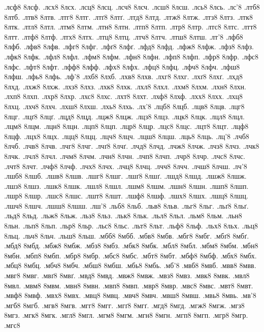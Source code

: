 {.лсф8
8лсф.
.лсх8
8лсх.
.лсц8
8лсц.
.лсч8
8лсч.
.лсш8
8лсш.
.лсь8
8лсь.
.лс'8
.лтб8
8лтб.
.лтв8
8лтв.
.лтг8
8лтг.
.лтґ8
8лтґ.
.лтд8
8лтд.
.лтж8
8лтж.
.лтз8
8лтз.
.лтк8
8лтк.
.лтл8
8лтл.
.лтм8
8лтм.
.лтн8
8лтн.
.лтп8
8лтп.
.лтр8
8лтр.
.лтс8
8лтс.
.лтт8
8лтт.
.лтф8
8лтф.
.лтх8
8лтх.
.лтц8
8лтц.
.лтч8
8лтч.
.лтш8
8лтш.
.лт'8
.лфб8
8лфб.
.лфв8
8лфв.
.лфг8
8лфг.
.лфґ8
8лфґ.
.лфд8
8лфд.
.лфж8
8лфж.
.лфз8
8лфз.
.лфк8
8лфк.
.лфл8
8лфл.
.лфм8
8лфм.
.лфн8
8лфн.
.лфп8
8лфп.
.лфр8
8лфр.
.лфс8
8лфс.
.лфт8
8лфт.
.лфф8
8лфф.
.лфх8
8лфх.
.лфц8
8лфц.
.лфч8
8лфч.
.лфш8
8лфш.
.лфь8
8лфь.
.лф'8
.лхб8
8лхб.
.лхв8
8лхв.
.лхг8
8лхг.
.лхґ8
8лхґ.
.лхд8
8лхд.
.лхж8
8лхж.
.лхз8
8лхз.
.лхк8
8лхк.
.лхл8
8лхл.
.лхм8
8лхм.
.лхн8
8лхн.
.лхп8
8лхп.
.лхр8
8лхр.
.лхс8
8лхс.
.лхт8
8лхт.
.лхф8
8лхф.
.лхх8
8лхх.
.лхц8
8лхц.
.лхч8
8лхч.
.лхш8
8лхш.
.лхь8
8лхь.
.лх'8
.лцб8
8лцб.
.лцв8
8лцв.
.лцг8
8лцг.
.лцґ8
8лцґ.
.лцд8
8лцд.
.лцж8
8лцж.
.лцз8
8лцз.
.лцк8
8лцк.
.лцл8
8лцл.
.лцм8
8лцм.
.лцн8
8лцн.
.лцп8
8лцп.
.лцр8
8лцр.
.лцс8
8лцс.
.лцт8
8лцт.
.лцф8
8лцф.
.лцх8
8лцх.
.лцц8
8лцц.
.лцч8
8лцч.
.лцш8
8лцш.
.лць8
8лць.
.лц'8
.лчб8
8лчб.
.лчв8
8лчв.
.лчг8
8лчг.
.лчґ8
8лчґ.
.лчд8
8лчд.
.лчж8
8лчж.
.лчз8
8лчз.
.лчк8
8лчк.
.лчл8
8лчл.
.лчм8
8лчм.
.лчн8
8лчн.
.лчп8
8лчп.
.лчр8
8лчр.
.лчс8
8лчс.
.лчт8
8лчт.
.лчф8
8лчф.
.лчх8
8лчх.
.лчц8
8лчц.
.лчч8
8лчч.
.лчш8
8лчш.
.лч'8
.лшб8
8лшб.
.лшв8
8лшв.
.лшг8
8лшг.
.лшґ8
8лшґ.
.лшд8
8лшд.
.лшж8
8лшж.
.лшз8
8лшз.
.лшк8
8лшк.
.лшл8
8лшл.
.лшм8
8лшм.
.лшн8
8лшн.
.лшп8
8лшп.
.лшр8
8лшр.
.лшс8
8лшс.
.лшт8
8лшт.
.лшф8
8лшф.
.лшх8
8лшх.
.лшц8
8лшц.
.лшч8
8лшч.
.лшш8
8лшш.
.лш'8
.льб8
8льб.
.льв8
8льв.
.льг8
8льг.
.льґ8
8льґ.
.льд8
8льд.
.льж8
8льж.
.льз8
8льз.
.льк8
8льк.
.льл8
8льл.
.льм8
8льм.
.льн8
8льн.
.льп8
8льп.
.льр8
8льр.
.льс8
8льс.
.льт8
8льт.
.льф8
8льф.
.льх8
8льх.
.льц8
8льц.
.льч8
8льч.
.льш8
8льш.
.мбб8
8мбб.
.мбв8
8мбв.
.мбг8
8мбг.
.мбґ8
8мбґ.
.мбд8
8мбд.
.мбж8
8мбж.
.мбз8
8мбз.
.мбк8
8мбк.
.мбл8
8мбл.
.мбм8
8мбм.
.мбн8
8мбн.
.мбп8
8мбп.
.мбр8
8мбр.
.мбс8
8мбс.
.мбт8
8мбт.
.мбф8
8мбф.
.мбх8
8мбх.
.мбц8
8мбц.
.мбч8
8мбч.
.мбш8
8мбш.
.мбь8
8мбь.
.мб'8
.мвб8
8мвб.
.мвв8
8мвв.
.мвг8
8мвг.
.мвґ8
8мвґ.
.мвд8
8мвд.
.мвж8
8мвж.
.мвз8
8мвз.
.мвк8
8мвк.
.мвл8
8мвл.
.мвм8
8мвм.
.мвн8
8мвн.
.мвп8
8мвп.
.мвр8
8мвр.
.мвс8
8мвс.
.мвт8
8мвт.
.мвф8
8мвф.
.мвх8
8мвх.
.мвц8
8мвц.
.мвч8
8мвч.
.мвш8
8мвш.
.мвь8
8мвь.
.мв'8
.мгб8
8мгб.
.мгв8
8мгв.
.мгг8
8мгг.
.мгґ8
8мгґ.
.мгд8
8мгд.
.мгж8
8мгж.
.мгз8
8мгз.
.мгк8
8мгк.
.мгл8
8мгл.
.мгм8
8мгм.
.мгн8
8мгн.
.мгп8
8мгп.
.мгр8
8мгр.
.мгс8
}
